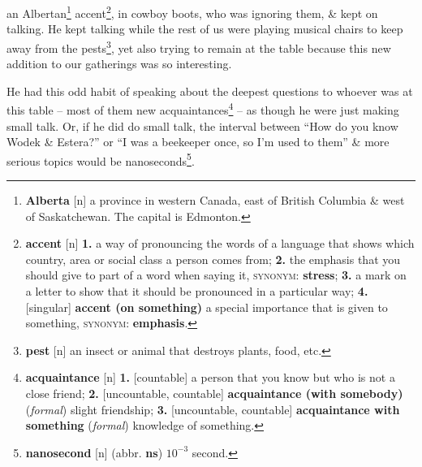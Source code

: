 \documentclass[oneside]{book}
\numberwithin{equation}{section}
\begin{document}
an Albertan\footnote{\textbf{Alberta} [n] a province in western Canada, east of British Columbia \& west of Saskatchewan. The capital is Edmonton.} accent\footnote{\textbf{accent} [n] \textbf{1.} a way of pronouncing the words of a language that shows which country, area or social class a person comes from; \textbf{2.} the emphasis that you should give to part of a word when saying it, \textsc{synonym}: \textbf{stress}; \textbf{3.} a mark on a letter to show that it should be pronounced in a particular way; \textbf{4.} [singular] \textbf{accent (on something)} a special importance that is given to something, \textsc{synonym}: \textbf{emphasis}.}, in cowboy boots, who was ignoring them, \& kept on talking. He kept talking while the rest of us were playing musical chairs to keep away from the pests\footnote{\textbf{pest} [n] an insect or animal that destroys plants, food, etc.}, yet also trying to remain at the table because this new addition to our gatherings was so interesting.

He had this odd habit of speaking about the deepest questions to whoever was at this table -- most of them new acquaintances\footnote{\textbf{acquaintance} [n] \textbf{1.} [countable] a person that you know but who is not a close friend; \textbf{2.} [uncountable, countable] \textbf{acquaintance (with somebody)} (\textit{formal}) slight friendship; \textbf{3.} [uncountable, countable] \textbf{acquaintance with something} (\textit{formal}) knowledge of something.} -- as though he were just making small talk. Or, if he did do small talk, the interval between ``How do you know Wodek \& Estera?'' or ``I was a beekeeper once, so I'm used to them'' \& more serious topics would be nanoseconds\footnote{\textbf{nanosecond} [n] (abbr. \textbf{ns}) $10^{-3}$ second.}.
\end{document}
